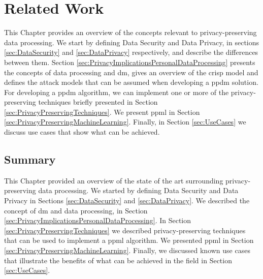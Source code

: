 %

\acresetall

\chapter{Related Work}
\label{ch:RelatedWork}


This Chapter provides an overview of the concepts relevant to privacy-preserving data processing.
We start by defining Data Security and Data Privacy, in sections \ref{sec:DataSecurity} and \ref{sec:DataPrivacy} respectively, and describe the differences between them.
Section \ref{sec:PrivacyImplicationsPersonalDataProcessing} presents the concepts of data processing and \ac{dm}, gives an overview of the \ac{crisp} model and defines the attack models that can be assumed when developing a \ac{ppdm} solution.
For developing a \ac{ppdm} algorithm, we can implement one or more of the privacy-preserving techniques briefly presented in Section \ref{sec:PrivacyPreservingTechniques}. 
We present \ac{ppml} in Section \ref{sec:PrivacyPreservingMachineLearning}. Finally, in Section \ref{sec:UseCases} we discuss use cases that show what can be achieved.









\section{Summary}
\label{sec:SummaryRelatedWork}

This Chapter provided an overview of the state of the art surrounding privacy-preserving data processing.
We started by defining Data Security and Data Privacy in Sections \ref{sec:DataSecurity} and \ref{sec:DataPrivacy}.
We described the concept of \ac{dm} and data processing, in Section \ref{sec:PrivacyImplicationsPersonalDataProcessing}.
In Section \ref{sec:PrivacyPreservingTechniques} we described privacy-preserving techniques that can be used to implement a \ac{ppml} algorithm.
We presented \ac{ppml} in Section \ref{sec:PrivacyPreservingMachineLearning}. Finally, we discussed known use cases that illustrate the benefits of what can be achieved in the field in Section \ref{sec:UseCases}.



